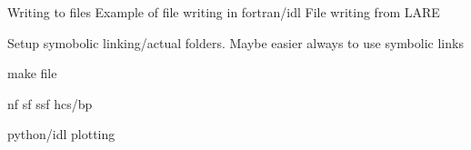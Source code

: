 Writing to files
Example of file writing in fortran/idl
File writing from LARE

Setup
symobolic linking/actual folders. Maybe easier always to use symbolic links

make file

nf
sf
ssf
hcs/bp

python/idl plotting